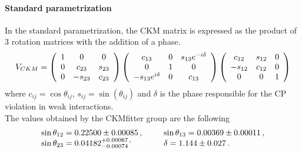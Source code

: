 \paragraph*{Standard parametrization}
In the standard parametrization, the CKM matrix is expressed as the product of 3 rotation matrices with the addition of a phase.
\begin{equation}
    V_{C K M}=\left(\begin{array}{c c c c}{{1}}&{{0}}&{{0}}\\ {{0}}&{{c_{23}}}&{{s_{23}}}\\ {{0}}&{{-s_{23}}}&{{c_{23}}}\end{array}\right)\left(\begin{array}{c c c}{{c_{13}}}&{{0}}&{{s_{13}e^{-i\delta}}}\\ {{0}}&{{1}}&{{0}}\\ {{-s_{13}e^{i\delta}}}&{{0}}&{{c_{13}}}\end{array}\right)\left(\begin{array}{c c c}{{c_{12}}}&{{s_{12}}}&{{0}}\\ {{-s_{12}}}&{{c_{12}}}&{{0}}\\{{0}}&{0}&{1}\end{array}\right)
\end{equation}
where  $c_{ij}=\cos{\theta_{ij}}$, $s_{ij}=\sin(\theta_{ij})$ and $\delta$ is the phase responsible for the CP violation in weak interactions.\\
The values obtained by the CKMfitter group are the following
\begin{equation}
    \begin{array}{l l}{{\sin\theta_{12}=0.22500\pm0.00085\,,~~~~~}}&{{\sin\theta_{13}=0.00369\pm0.00011\,,}}\\ {{\sin\theta_{23}=0.04182_{-0.00074}^{+0.00067\,,}~~~~}}&{{\delta=1.144\pm0.027\,.}}\end{array}
\end{equation}


